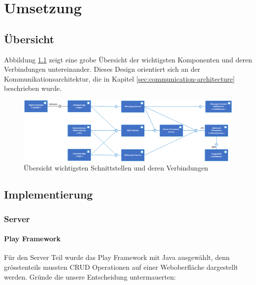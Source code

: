 \newpage
\chapter{Umsetzung}

\section{Übersicht}

Abbildung \ref{fig:component-overview} zeigt eine grobe Übersicht der wichtigsten Komponenten und deren Verbindungen untereinander. Dieses Design orientiert sich an der Kommunikationsarchitektur, die in Kapitel \ref{sec:communication-architecture} beschrieben wurde.

\begin{figure}[H]
	\includegraphics[width=1.0\textwidth]{images/component-overview.png}
	\caption{Übersicht wichtigsten Schnittstellen und deren Verbindungen }
	\label{fig:component-overview}
\end{figure}
\section{Implementierung}

\subsection{Server}

\subsubsection{Play Framework}
Für den Server Teil wurde das Play Framework mit Java ausgewählt, denn grösstenteils mussten CRUD Operationen auf einer Weboberfläche dargestellt werden. Gründe die unsere Entscheidung untermauerten:

